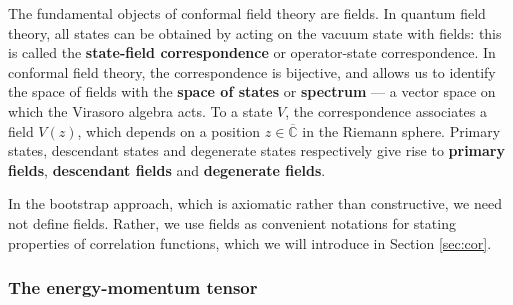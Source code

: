 \documentclass[12pt, a4paper]{article}
\newcommand{\myindex}[1]{\textbf{\boldmath #1}}
\theoremstyle{break}
\begin{document}
The fundamental objects of conformal field theory are fields. In quantum field theory, all states can be obtained by acting on the vacuum state with fields: this is called the \myindex{state-field correspondence} or operator-state correspondence. In conformal field theory, the correspondence is bijective, and allows us to identify the space of fields with the \myindex{space of states}  or \myindex{spectrum}  --- a vector space on which the Virasoro algebra acts. To a state $V$, the correspondence associates a field $V(z)$, which depends on a position $z\in\overline{\mathbb{C}}$ in the Riemann sphere. Primary states, descendant states and degenerate states respectively give rise to \myindex{primary fields}, \myindex{descendant fields} and \myindex{degenerate fields}.

In the bootstrap approach, which is axiomatic rather than constructive, we need not define fields. Rather, we use fields as convenient notations for stating properties of correlation functions, which we will introduce in Section \ref{sec:cor}. 

\subsubsection{The energy-momentum tensor}
\end{document}
